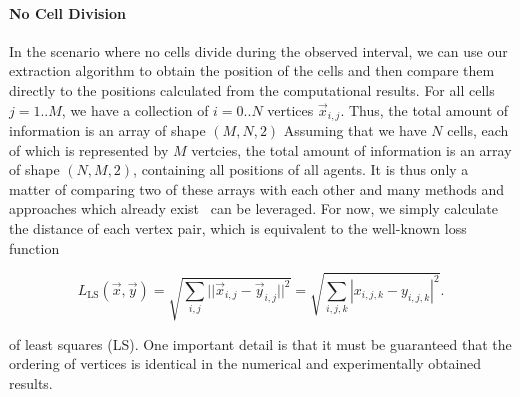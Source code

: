 \documentclass{article}
\begin{document}
\paragraph{No Cell Division}
In the scenario where no cells divide during the observed interval, we can use our extraction
algorithm to obtain the position of the cells and then compare them directly to the positions
calculated from the computational results.
For all cells $j=1..M$, we have a collection of $i=0..N$ vertices $\vec{x}_{i,j}$.
Thus, the total amount of information is an array of shape $(M,N,2)$
Assuming that we have $N$ cells, each of which is represented by $M$ vertcies, the total amount of
information is an array of shape $(N,M,2)$, containing all positions of all agents.
It is thus only a matter of comparing two of these arrays with each other and many methods and
approaches which already exist~\cite{Wang2020} can be leveraged.
For now, we simply calculate the distance of each vertex pair, which is equivalent to the
well-known loss function

\begin{equation}
    L_{\text{LS}}(\vec{x}, \vec{y})
        = \sqrt{\sum\limits_{i,j}||\vec{x}_{i,j}-\vec{y}_{i,j}||^2}
        = \sqrt{\sum\limits_{i,j,k}|x_{i,j,k}-y_{i,j,k}|^2}.
\end{equation}

of least squares (LS).
One important detail is that it must be guaranteed that the ordering of vertices is identical in the
numerical and experimentally obtained results.
\end{document}
